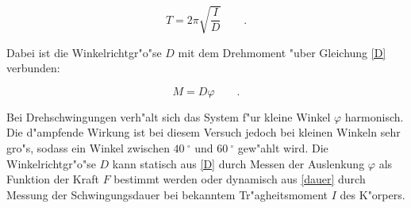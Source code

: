 	\begin{equation}
		T = 2\pi \sqrt{\frac{I}{D}} \qquad . \label{dauer}
	\end{equation}

	Dabei ist die Winkelrichtgr"o"se $D$ mit dem Drehmoment "uber Gleichung \eqref{D} verbunden:

	\begin{equation}
		M = D \varphi \qquad . \label{D}
	\end{equation}

	Bei Drehschwingungen verh"alt sich das System f"ur kleine Winkel $\varphi$ harmonisch.
	Die d"ampfende Wirkung ist bei diesem Versuch jedoch bei kleinen Winkeln sehr gro"s, sodass ein Winkel zwischen $\SI{40}{^\circ}$ und $\SI{60}{^\circ}$ gew"ahlt wird. 
	Die Winkelrichtgr"o"se $D$ kann statisch aus \eqref{D} durch Messen der Auslenkung $\varphi$ als Funktion der Kraft $F$ bestimmt werden oder dynamisch aus \eqref{dauer} durch Messung der Schwingungsdauer bei bekanntem Tr"agheitsmoment $I$ des K"orpers.